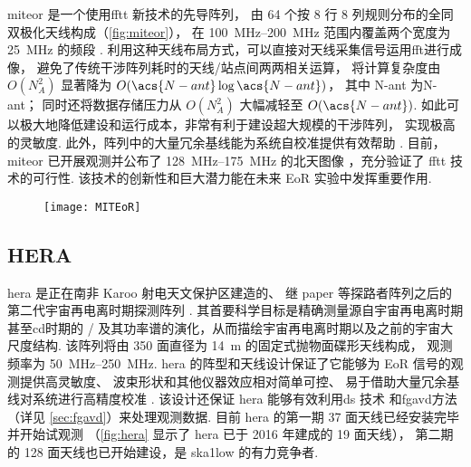\acf{miteor} 是一个使用\ac{fftt} 新技术\cite{tegmark2009,tegmark2010}的先导阵列，
由 64 个按 8 行 8 列规则分布的全同双极化天线构成（\autoref{fig:miteor}），
在 \SIrange{100}{200}{\MHz} 范围内覆盖两个宽度为 \SI{25}{\MHz} 的频段
\cite{zheng2014}.
利用这种天线布局方式，可以直接对天线采集信号运用\ac{fft}进行成像，
避免了传统干涉阵列耗时的天线/站点间两两相关运算，
将计算复杂度由 $O(N_{\!A}^2)$ 显著降为 $O(\acs{N-ant} \log\acs{N-ant})$，
其中 \acs{N-ant} 为\acl{N-ant}；
同时还将数据存储压力从 $O(N_{\!A}^2)$ 大幅减轻至 $O(\acs{N-ant})$.
如此可以极大地降低建设和运行成本，非常有利于建设超大规模的干涉阵列，
实现极高的灵敏度.
此外，阵列中的大量冗余基线能为系统自校准提供有效帮助 \cite{dillon2016}.
目前，\acs{miteor} 已开展观测并公布了 \SIrange{128}{175}{\MHz} 的北天图像
\cite{zheng2017}，充分验证了 \acs{fftt} 技术的可行性.
该技术的创新性和巨大潜力能在未来 EoR 实验中发挥重要作用.

\begin{figure}
  \centering
  \texttt{[image: MITEoR]}
  \label{fig:miteor}
\end{figure}

\subsection{HERA}

\acf{hera} 是正在南非 Karoo 射电天文保护区建造的、
继 \ac{paper} 等探路者阵列之后的第二代宇宙再电离时期探测阵列 \cite{deboer2017}.
其首要科学目标是精确测量源自宇宙再电离时期甚至\acl{cd}时期的 \hisignal/
及其功率谱的演化，从而描绘宇宙再电离时期以及之前的宇宙大尺度结构.
该阵列将由 350 面直径为 \SI{14}{\meter} 的固定式抛物面碟形天线构成，
观测频率为 \SIrange{50}{250}{\MHz}.
\acs{hera} 的阵型和天线设计保证了它能够为 EoR 信号的观测提供高灵敏度、
波束形状和其他仪器效应相对简单可控、
易于借助大量冗余基线对系统进行高精度校准 \cite{dillon2016}.
该设计还保证 \acs{hera} 能够有效利用\ac{ds} 技术\cite{parsons2012}
和\acl{fgavd}方法（详见 \autoref{sec:fgavd}）来处理观测数据.
目前 \acs{hera} 的第一期 37 面天线已经安装完毕并开始试观测
（\autoref{fig:hera} 显示了 \acs{hera} 已于 2016 年建成的 19 面天线），
第二期的 128 面天线也已开始建设，是 \acs{ska1low} 的有力竞争者.

